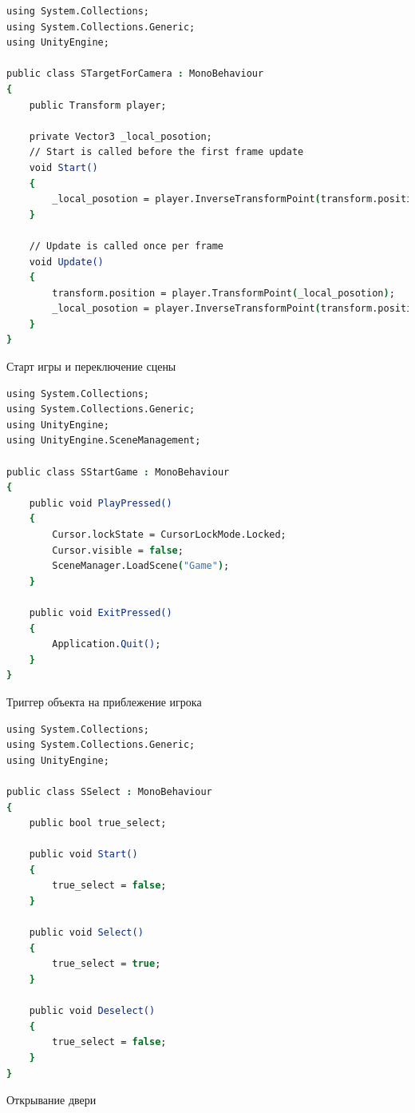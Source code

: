 \begin{lstlisting}[language=csh]
using System.Collections;
using System.Collections.Generic;
using UnityEngine;

public class STargetForCamera : MonoBehaviour
{
    public Transform player;

    private Vector3 _local_posotion;
    // Start is called before the first frame update
    void Start()
    {
        _local_posotion = player.InverseTransformPoint(transform.position);
    }

    // Update is called once per frame
    void Update()
    {
        transform.position = player.TransformPoint(_local_posotion);
        _local_posotion = player.InverseTransformPoint(transform.position);
    }
}
\end{lstlisting}

 Старт игры и переключение сцены

\begin{lstlisting}[language=csh]
using System.Collections;
using System.Collections.Generic;
using UnityEngine;
using UnityEngine.SceneManagement;

public class SStartGame : MonoBehaviour
{
    public void PlayPressed()
    {
        Cursor.lockState = CursorLockMode.Locked;
        Cursor.visible = false;
        SceneManager.LoadScene("Game");
    }

    public void ExitPressed()
    {
        Application.Quit();
    }
}
\end{lstlisting}

 Триггер объекта на приблежение игрока

\begin{lstlisting}[language=csh]
using System.Collections;
using System.Collections.Generic;
using UnityEngine;

public class SSelect : MonoBehaviour
{
    public bool true_select;

    public void Start()
    {
        true_select = false;
    }

    public void Select()
    {
        true_select = true;
    }

    public void Deselect()
    {
        true_select = false;
    }
}
\end{lstlisting}

 Открывание двери

